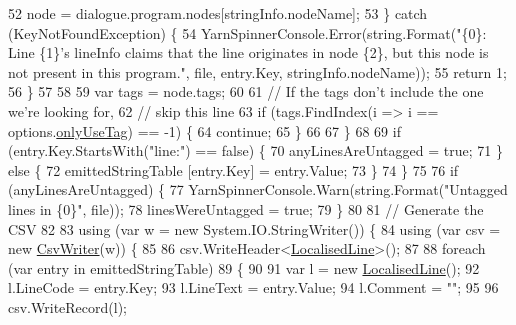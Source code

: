 \begin{DoxyCode}
52                             node = dialogue.program.nodes[stringInfo.nodeName];
53                         \} \textcolor{keywordflow}{catch} (KeyNotFoundException) \{
54                             YarnSpinnerConsole.Error(string.Format(\textcolor{stringliteral}{"\{0\}: Line \{1\}'s lineInfo claims that
       the line originates in node \{2\}, but this node is not present in this program."}, file, entry.Key, 
      stringInfo.nodeName));
55                             \textcolor{keywordflow}{return} 1;
56                         \}
57 
58 
59                         var tags = node.tags;
60 
61                         \textcolor{comment}{// If the tags don't include the one we're looking for,}
62                         \textcolor{comment}{// skip this line}
63                         \textcolor{keywordflow}{if} (tags.FindIndex(i => i == options.\hyperlink{a00083_a8b30c1b7fb1b74eae455a568c1024b3d}{onlyUseTag}) == -1) \{
64                             \textcolor{keywordflow}{continue};
65                         \}
66 
67                     \}
68 
69                     \textcolor{keywordflow}{if} (entry.Key.StartsWith(\textcolor{stringliteral}{"line:"}) == \textcolor{keyword}{false}) \{
70                         anyLinesAreUntagged = \textcolor{keyword}{true};
71                     \} \textcolor{keywordflow}{else} \{
72                         emittedStringTable [entry.Key] = entry.Value;
73                     \}
74                 \}
75 
76                 \textcolor{keywordflow}{if} (anyLinesAreUntagged) \{
77                     YarnSpinnerConsole.Warn(string.Format(\textcolor{stringliteral}{"Untagged lines in \{0\}"}, file));
78                     linesWereUntagged = \textcolor{keyword}{true};
79                 \}
80 
81                 \textcolor{comment}{// Generate the CSV}
82 
83                 \textcolor{keyword}{using} (var w = \textcolor{keyword}{new} System.IO.StringWriter()) \{
84                     \textcolor{keyword}{using} (var csv = \textcolor{keyword}{new} \hyperlink{a00059}{CsvWriter}(w)) \{
85 
86                         csv.WriteHeader<\hyperlink{a00106}{LocalisedLine}>();
87 
88                         \textcolor{keywordflow}{foreach} (var entry \textcolor{keywordflow}{in} emittedStringTable)
89                         \{
90 
91                             var l = \textcolor{keyword}{new} \hyperlink{a00106}{LocalisedLine}();
92                             l.LineCode = entry.Key;
93                             l.LineText = entry.Value;
94                             l.Comment = \textcolor{stringliteral}{""};
95 
96                             csv.WriteRecord(l);

\end{DoxyCode}
